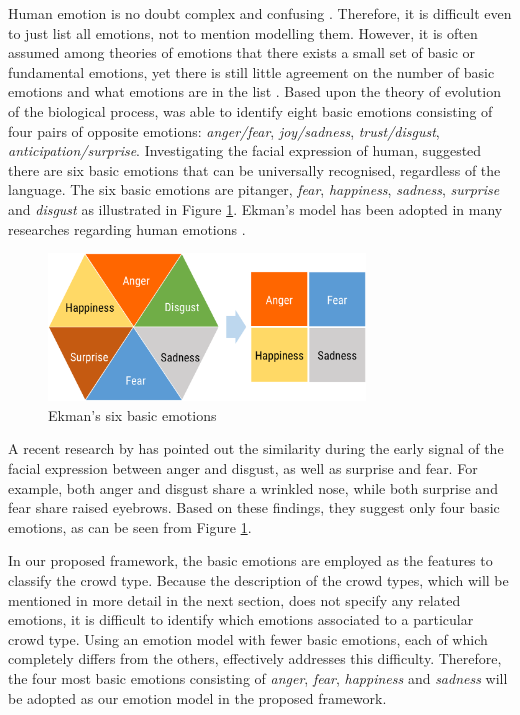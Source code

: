 Human emotion is no doubt complex and confusing \citet{plutchik2001nature}. Therefore, it is difficult even to just list all emotions, not to mention modelling them. However, it is often assumed among theories of emotions that there exists a small set of basic or fundamental emotions, yet there is still little agreement on the number of basic emotions and what emotions are in the list \citep{Ortony1990}. Based upon the theory of evolution of the biological process, \citet{plutchik2001integration} was able to identify eight basic emotions consisting of four pairs of opposite emotions: \textit{anger/fear}, \textit{joy/sadness}, \textit{trust/disgust}, \textit{anticipation/surprise}. Investigating the facial expression of human, \citet{ekman1971constants} suggested there are six basic emotions that can be universally recognised, regardless of the language. The six basic emotions are \textgit pit{anger}, \textit{fear}, \textit{happiness}, \textit{sadness}, \textit{surprise} and \textit{disgust} as illustrated in Figure \ref{fig:emotionModel}. Ekman's model has been adopted in many researches regarding human emotions \citep{mohammad2014using, roberts2012empatweet, alm2005emotions}. 

\begin{figure}[htb!]
\centering    
\includegraphics[width=0.75\textwidth]{EkmanModel}
\caption{Ekman's six basic emotions}
\label{fig:emotionModel}
\end{figure}

A recent research by \cite{Jack2014} has pointed out the similarity during the early signal of the facial expression between anger and disgust, as well as surprise and fear. For example, both anger and disgust share a wrinkled nose, while both surprise and fear share raised eyebrows. Based on these findings, they suggest only four basic emotions, as can be seen from Figure \ref{fig:emotionModel}.

In our proposed framework, the basic emotions are employed as the features to classify the crowd type. Because the description of the crowd types, which will be mentioned in more detail in the next section, does not specify any related emotions, it is difficult to identify which emotions associated to a particular crowd type. Using an emotion model with fewer basic emotions, each of which completely differs from the others, effectively addresses this difficulty. Therefore, the four most basic emotions consisting of \textit{anger}, \textit{fear}, \textit{happiness} and \textit{sadness} will be adopted as our emotion model in the proposed framework.

